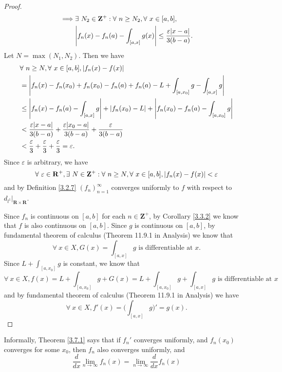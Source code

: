 \begin{proof}
\begin{align*}
        \implies & \exists\ N_2 \in \mathbf{Z}^+ : \forall\ n \geq N_2, \forall\ x \in [a, b],                                                     \\
                 & \abs*{f_n(x) - f_n(a) - \int_{[a, x]} g(x)} \leq \frac{\varepsilon \abs*{x - a}}{3(b - a)}.
    \end{align*}
    Let \(N = \max(N_1, N_2)\).
    Then we have
    \begin{align*}
         & \forall\ n \geq N, \forall\ x \in [a, b], \abs*{f_n(x) - f(x)}                                                           \\
         & = \abs*{f_n(x) - f_n(x_0) + f_n(x_0) - f_n(a) + f_n(a) - L + \int_{[a, x_0]} g - \int_{[a, x]} g}                        \\
         & \leq \abs*{f_n(x) - f_n(a) - \int_{[a, x]} g} + \abs*{f_n(x_0) - L} + \abs*{f_n(x_0) - f_n(a) - \int_{[a, x_0]} g}       \\
         & < \frac{\varepsilon \abs*{x - a}}{3(b - a)} + \frac{\varepsilon \abs*{x_0 - a}}{3(b - a)} + \frac{\varepsilon}{3(b - a)} \\
         & < \frac{\varepsilon}{3} + \frac{\varepsilon}{3} + \frac{\varepsilon}{3} = \varepsilon.
    \end{align*}
    Since \(\varepsilon\) is arbitrary, we have
    \[
        \forall\ \varepsilon \in \mathbf{R}^+, \exists\ N \in \mathbf{Z}^+ : \forall\ n \geq N, \forall\ x \in [a, b], \abs*{f_n(x) - f(x)} < \varepsilon
    \]
    and by Definition \ref{3.2.7} \((f_n)_{n = 1}^\infty\) converges uniformly to \(f\) with respect to \(d_{l^1}|_{\mathbf{R} \times \mathbf{R}}\).

    Since \(f_n\) is continuous on \([a, b]\) for each \(n \in \mathbf{Z}^+\), by Corollary \ref{3.3.2} we know that \(f\) is also continuous on \([a, b]\).
    Since \(g\) is continuous on \([a, b]\), by fundamental theorem of calculus (Theorem 11.9.1 in Analysis) we know that
    \[
        \forall\ x \in X, G(x) = \int_{[a, x]} g \text{ is differentiable at } x.
    \]
    Since \(L + \int_{[a, x_0]} g\) is constant, we know that
    \[
        \forall\ x \in X, f(x) = L + \int_{[a, x_0]} g + G(x) = L + \int_{[a, x_0]} g + \int_{[a, x]} g \text{ is differentiable at } x
    \]
    and by fundamental theorem of calculus (Theorem 11.9.1 in Analysis) we have
    \[
        \forall\ x \in X, f'(x) = \bigg(\int_{[a, x]} g\bigg)' = g(x).
    \]
\end{proof}

\begin{note}
    Informally, Theorem \ref{3.7.1} says that if \(f_n'\) converges uniformly, and \(f_n(x_0)\) converges for some \(x_0\), then \(f_n\) also converges uniformly, and
    \[
        \frac{d}{dx} \lim_{n \to \infty} f_n(x) = \lim_{n \to \infty} \frac{d}{dx} f_n(x)
    \]
\end{note}

